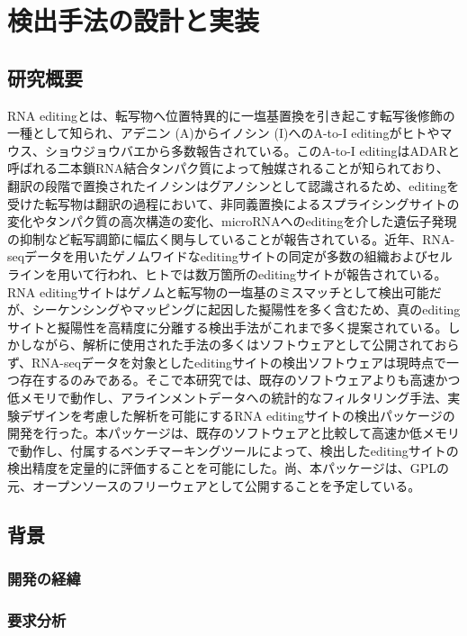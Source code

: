 \chapter{検出手法の設計と実装}

\section{研究概要}
RNA editingとは、転写物へ位置特異的に一塩基置換を引き起こす転写後修飾の一種として知られ、アデニン (A)からイノシン (I)へのA-to-I editingがヒトやマウス、ショウジョウバエから多数報告されている。このA-to-I editingはADARと呼ばれる二本鎖RNA結合タンパク質によって触媒されることが知られており、翻訳の段階で置換されたイノシンはグアノシンとして認識されるため、editingを受けた転写物は翻訳の過程において、非同義置換によるスプライシングサイトの変化やタンパク質の高次構造の変化、microRNAへのeditingを介した遺伝子発現の抑制など転写調節に幅広く関与していることが報告されている。近年、RNA-seqデータを用いたゲノムワイドなeditingサイトの同定が多数の組織およびセルラインを用いて行われ、ヒトでは数万箇所のeditingサイトが報告されている。RNA editingサイトはゲノムと転写物の一塩基のミスマッチとして検出可能だが、シーケンシングやマッピングに起因した擬陽性を多く含むため、真のeditingサイトと擬陽性を高精度に分離する検出手法がこれまで多く提案されている。しかしながら、解析に使用された手法の多くはソフトウェアとして公開されておらず、RNA-seqデータを対象としたeditingサイトの検出ソフトウェアは現時点で一つ存在するのみである。そこで本研究では、既存のソフトウェアよりも高速かつ低メモリで動作し、アラインメントデータへの統計的なフィルタリング手法、実験デザインを考慮した解析を可能にするRNA editingサイトの検出パッケージの開発を行った。本パッケージは、既存のソフトウェアと比較して高速か低メモリで動作し、付属するベンチマーキングツールによって、検出したeditingサイトの検出精度を定量的に評価することを可能にした。尚、本パッケージは、GPLの元、オープンソースのフリーウェアとして公開することを予定している。

\section{背景}
\subsection{開発の経緯}
\subsection{要求分析}

